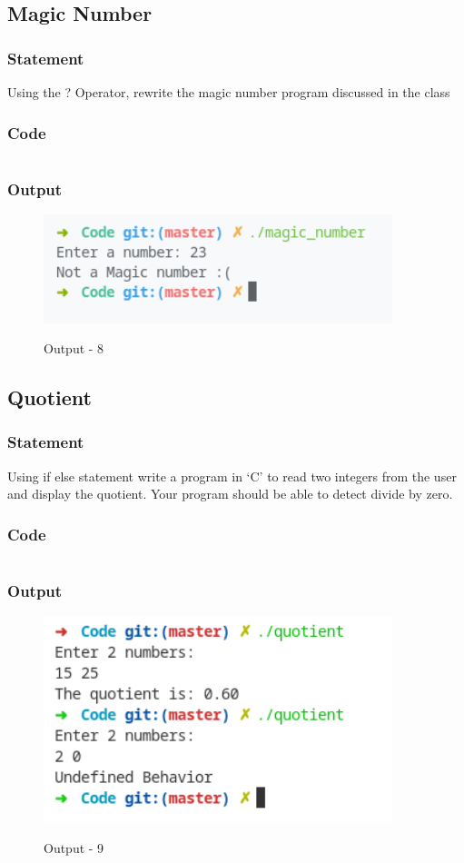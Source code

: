 \pagebreak
\subsection{Magic Number}

\subsubsection{Statement}
Using the ? Operator, rewrite the magic number program discussed in the class

\subsubsection{Code}
\inputminted[]{c}{'../Code/magic_number.cpp'}
\subsubsection{Output}
\begin{figure}[!htb]
  \centering
  \includegraphics[width=4in]{Images/magic_number.png}
  \label{output-8}
  \caption{Output - 8}
\end{figure}


\pagebreak
\subsection{Quotient}
\subsubsection{Statement}
Using if else statement write a program in ‘C’ to read two integers from the user and display
the quotient. Your program should be able to detect divide by zero.
\subsubsection{Code}
\inputminted[]{c}{../Code/quotient.cpp}
\subsubsection{Output}
\begin{figure}[!htb]
  \centering
  \includegraphics[width=4in]{Images/quotient.png}
  \label{Output-9}
  \caption{Output - 9}
\end{figure}


